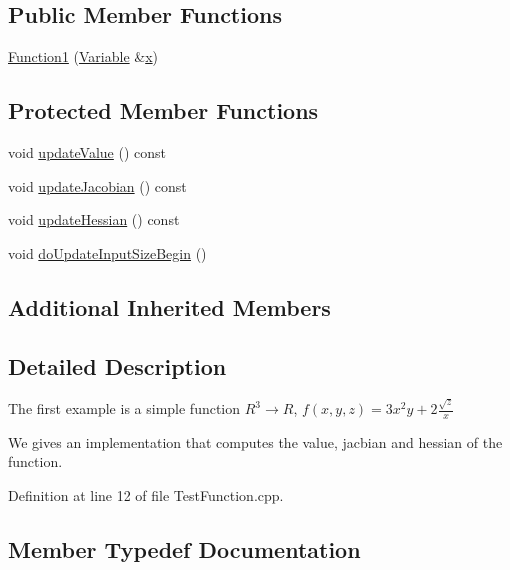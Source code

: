\subsection*{Public Member Functions}
\begin{DoxyCompactItemize}
\item 
\hyperlink{classFunction1_a6b618d85fab472effe2624a8384c1674}{Function1} (\hyperlink{classocra_1_1Variable}{Variable} \&\hyperlink{classocra_1_1Function_a28825886d1f149c87b112ec2ec1dd486}{x})
\end{DoxyCompactItemize}
\subsection*{Protected Member Functions}
\begin{DoxyCompactItemize}
\item 
void \hyperlink{classFunction1_a95bc8ed2b08882cda37512e8f13fcba1}{update\+Value} () const
\item 
void \hyperlink{classFunction1_aff45595ff1b5fb4108e5313b31d3d774}{update\+Jacobian} () const
\item 
void \hyperlink{classFunction1_a1d88a2ebb5ad3cb35f7d40ab002b71f0}{update\+Hessian} () const
\item 
void \hyperlink{classFunction1_aec0bc51f050a1bd32cece26e524e5c97}{do\+Update\+Input\+Size\+Begin} ()
\end{DoxyCompactItemize}
\subsection*{Additional Inherited Members}


\subsection{Detailed Description}
The first example is a simple function $ R^3 \rightarrow R $, $ f(x,y,z) = 3x^2y+2\frac{\sqrt{z}}{x}$

We gives an implementation that computes the value, jacbian and hessian of the function. 

Definition at line 12 of file Test\+Function.\+cpp.



\subsection{Member Typedef Documentation}
\hypertarget{classFunction1_a3248b79eedbe37ed0e285db564a530fe}{}\label{classFunction1_a3248b79eedbe37ed0e285db564a530fe} 
